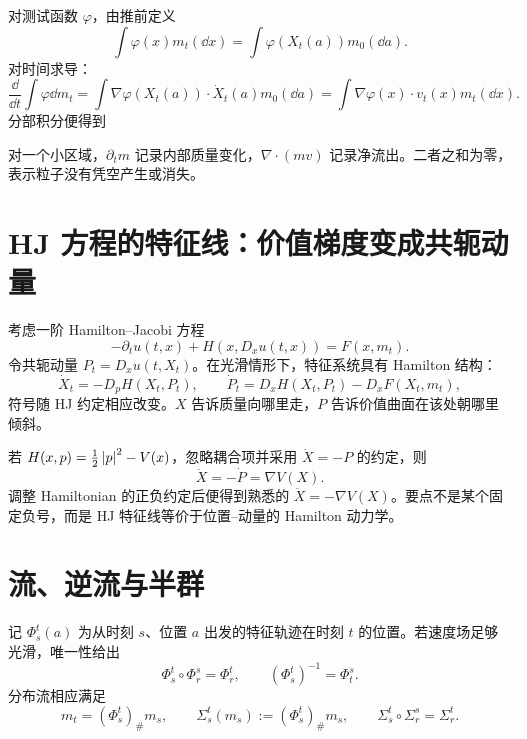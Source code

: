 对测试函数 $\varphi$，由推前定义
\[
\int\varphi(x)m_t(\dd x)=\int\varphi(X_t(a))m_0(\dd a).
\]
对时间求导：
\[
\frac{\dd}{\dd t}\int\varphi\dd m_t
=\int\nabla\varphi(X_t(a))\cdot\dot X_t(a)m_0(\dd a)
=\int\nabla\varphi(x)\cdot v_t(x)m_t(\dd x).
\]
分部积分便得到

\begin{intuition}[散度项的含义]
对一个小区域，$\partial_tm$ 记录内部质量变化，$\nabla\cdot(mv)$ 记录净流出。二者之和为零，表示粒子没有凭空产生或消失。
\end{intuition}

\section{HJ 方程的特征线：价值梯度变成共轭动量}

考虑一阶 Hamilton--Jacobi 方程
\[
-\partial_tu(t,x)+H(x,D_xu(t,x))=F(x,m_t).
\]
令共轭动量 $P_t=D_xu(t,X_t)$。在光滑情形下，特征系统具有 Hamilton 结构：
\[
\dot X_t=-D_pH(X_t,P_t),
\qquad
\dot P_t=D_xH(X_t,P_t)-D_xF(X_t,m_t),
\]
符号随 HJ 约定相应改变。$X$ 告诉质量向哪里走，$P$ 告诉价值曲面在该处朝哪里倾斜。

\begin{examplebox}
若 $H(x,p)=\tfrac12\left\lvert p\right\rvert^2-V(x)$，忽略耦合项并采用 $\dot X=-P$ 的约定，则
\[
\ddot X=-\dot P=\nabla V(X).
\]
调整 Hamiltonian 的正负约定后便得到熟悉的 $\ddot X=-\nabla V(X)$。要点不是某个固定负号，而是 HJ 特征线等价于位置--动量的 Hamilton 动力学。
\end{examplebox}

\section{流、逆流与半群}

记 $\Phi_s^t(a)$ 为从时刻 $s$、位置 $a$ 出发的特征轨迹在时刻 $t$ 的位置。若速度场足够光滑，唯一性给出
\[
\Phi_s^t\circ\Phi_r^s=\Phi_r^t,
\qquad
(\Phi_s^t)^{-1}=\Phi_t^s.
\]
分布流相应满足
\[
m_t=(\Phi_s^t)_\#m_s,
\qquad
\Sigma_s^t(m_s):=(\Phi_s^t)_\#m_s,
\qquad
\Sigma_s^t\circ\Sigma_r^s=\Sigma_r^t.
\]

\begin{center}
\end{center}

